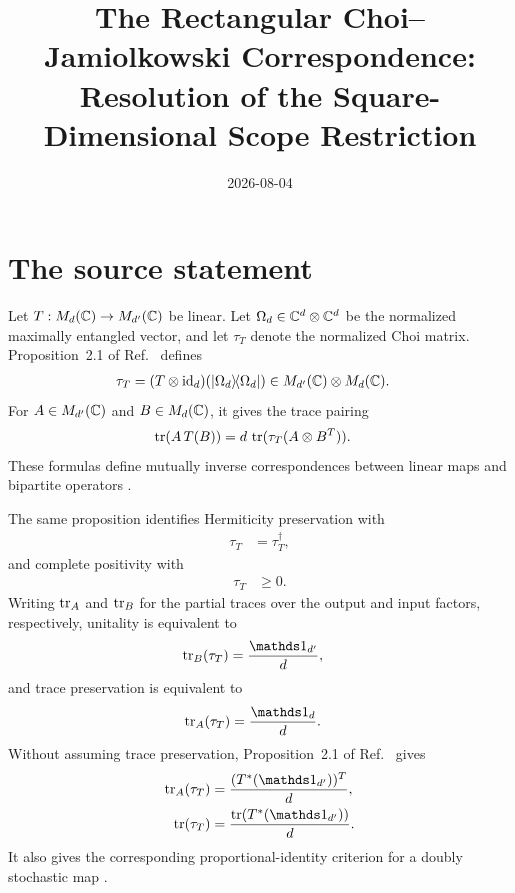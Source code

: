 \documentclass{article}
\title{The Rectangular Choi--Jamiolkowski Correspondence:\\
Resolution of the Square-Dimensional Scope Restriction}
\author{}
\date{2026-08-04}
\begin{document}
\maketitle
{}

\section{The source statement}

Let $T:M_{d}(\mathbb{C})\to M_{d'}(\mathbb{C})$ be linear. Let
$\Omega_d\in\mathbb{C}^d\otimes\mathbb{C}^d$ be the normalized maximally entangled vector,
and let $\tau_T$ denote the normalized Choi matrix. Proposition~2.1 of
Ref.~\cite{Wolf2012Quantum} defines
\begin{align}
    \tau_T
        &=(T\otimes\operatorname{id}_d)
          (|\Omega_d\rangle\!\langle \Omega_d|)
          \in M_{d'}(\mathbb{C})\otimes M_{d}(\mathbb{C}).
    \label{eq:wolf_choi_rectangular_scope_choi_matrix}
\end{align}
For $A\in M_{d'}(\mathbb{C})$ and $B\in M_{d}(\mathbb{C})$, it gives the trace pairing
\begin{align}
    \operatorname{tr}(A\,T(B))
        &=d\,\operatorname{tr}(\tau_T(A\otimes B^T)).
    \label{eq:wolf_choi_rectangular_scope_trace_pairing}
\end{align}
These formulas define mutually inverse correspondences between linear maps
and bipartite operators \cite[Proposition~2.1]{Wolf2012Quantum}.

The same proposition identifies Hermiticity preservation with
\begin{align}
    \tau_T
        &=\tau_T^\dagger,
    \label{eq:wolf_choi_rectangular_scope_hermiticity_condition}
\end{align}
and complete positivity with
\begin{align}
    \tau_T
        &\geq0.
    \label{eq:wolf_choi_rectangular_scope_complete_positivity_condition}
\end{align}
Writing $\operatorname{tr}_A$ and $\operatorname{tr}_B$ for the partial traces over the output and input
factors, respectively, unitality is equivalent to
\begin{align}
    \tr_B(\tau_T)
        &=\frac{\Id_{d'}}{d},
    \label{eq:wolf_choi_rectangular_scope_unital_partial_trace}
\end{align}
and trace preservation is equivalent to
\begin{align}
    \tr_A(\tau_T)
        &=\frac{\Id_d}{d}.
    \label{eq:wolf_choi_rectangular_scope_trace_preserving_partial_trace}
\end{align}
Without assuming trace preservation, Proposition~2.1 of
Ref.~\cite{Wolf2012Quantum} gives
\begin{align}
    \tr_A(\tau_T)
        &=\frac{(T^*(\Id_{d'}))^T}{d},
    \label{eq:wolf_choi_rectangular_scope_general_left_partial_trace}\\
    \tr(\tau_T)
        &=\frac{\tr(T^*(\Id_{d'}))}{d}.
    \label{eq:wolf_choi_rectangular_scope_general_trace}
\end{align}
It also gives the corresponding proportional-identity criterion for a
doubly stochastic map \cite[Proposition~2.1]{Wolf2012Quantum}.
\end{document}

